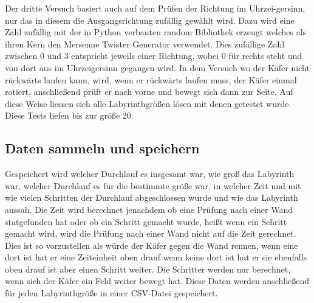 \documentclass[11pt, a4paper]{article}
\begin{document}
Der dritte Versuch basiert auch auf dem Prüfen der Richtung im Uhrzei-gersinn, nur das in diesem die Ausgangsrichtung zufällig gewählt wird. Dazu wird eine Zahl zufällig mit der in Python verbauten random Bibliothek erzeugt welches als ihren Kern den Mersenne Twister Generator verwendet. Dies zufällige Zahl zwischen 0 und 3 entspricht jeweils einer Richtung, wobei 0 für rechts steht und von dort aus im Uhrzeigersinn gegangen wird. In dem Versuch wo der Käfer nicht rückwärts laufen kann, wird, wenn er rückwärts laufen muss, der Käfer einmal rotiert, anschließend prüft er nach vorne und bewegt sich dann zur Seite. Auf diese Weise liessen sich alle Labyrinthgrößen lösen mit denen getestet wurde. Diese Tests liefen bis zur größe 20.

\subsection{Daten sammeln und speichern}

Gespeichert wird welcher Durchlauf es insgesamt war, wie groß das Labyrinth war, welcher Durchlauf es für die bestimmte größe war, in welcher Zeit und mit wie vielen Schritten der Durchlauf abgeschlossen wurde und wie das Labyrinth aussah. Die Zeit wird berechnet jenachdem ob eine Prüfung nach einer Wand statgefunden hat oder ob ein Schritt gemacht wurde, heißt wenn ein Schritt gemacht wird, wird die Prüfung nach einer Wand nicht auf die Zeit gerechnet. Dies ist so vorzustellen als würde der Käfer gegen die Wand rennen, wenn eine dort ist hat er eine Zeiteinheit oben drauf wenn keine dort ist hat er sie ebenfalls oben drauf ist aber einen Schritt weiter. Die Schritter werden nur berechnet, wenn sich der Käfer ein Feld weiter bewegt hat.
Diese Daten werden anschließend für jeden Labyrinthgröße in einer CSV-Datei gespeichert.
\end{document}
